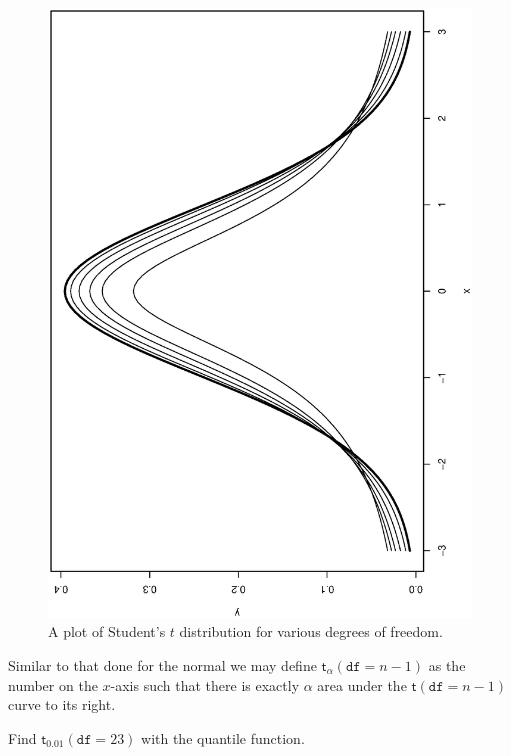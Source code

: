 \documentclass[captions=tableheading]{scrbook}
\begin{document}
\begin{figure}[th]
  \includegraphics[angle=270, totalheight=4in]{ps/Student's-t-dist-vary-df.ps}
  \caption[Student's \(t\) distribution for various degrees of freedom]{\small A plot of Student's \(t\) distribution for various degrees of freedom.}
  \label{fig:Student's-t-dist-vary-df}
\end{figure}

Similar to that done for the normal we may define \(\mathsf{t}_{\alpha}(\mathtt{df}=n-1)\) as the number on the \(x\)-axis such that there is exactly \(\alpha\) area under the \(\mathsf{t}(\mathtt{df}=n-1)\) curve to its right.

\begin{example}
Find \(\mathsf{t}{}_{0.01}(\mathtt{df}=23)\) with the quantile function.
\end{example}
\end{document}
